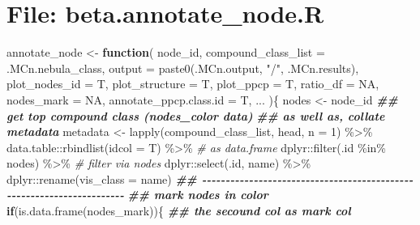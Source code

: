 \documentclass[
]{article}
\newenvironment{Shaded}{\begin{snugshade}}{\end{snugshade}}
\newcommand{\AttributeTok}[1]{\textcolor[rgb]{0.77,0.63,0.00}{#1}}
\newcommand{\CommentTok}[1]{\textcolor[rgb]{0.56,0.35,0.01}{\textit{#1}}}
\newcommand{\ConstantTok}[1]{\textcolor[rgb]{0.00,0.00,0.00}{#1}}
\newcommand{\ControlFlowTok}[1]{\textcolor[rgb]{0.13,0.29,0.53}{\textbf{#1}}}
\newcommand{\DecValTok}[1]{\textcolor[rgb]{0.00,0.00,0.81}{#1}}
\newcommand{\DocumentationTok}[1]{\textcolor[rgb]{0.56,0.35,0.01}{\textbf{\textit{#1}}}}
\newcommand{\FunctionTok}[1]{\textcolor[rgb]{0.00,0.00,0.00}{#1}}
\newcommand{\NormalTok}[1]{#1}
\newcommand{\OtherTok}[1]{\textcolor[rgb]{0.56,0.35,0.01}{#1}}
\newcommand{\SpecialCharTok}[1]{\textcolor[rgb]{0.00,0.00,0.00}{#1}}
\newcommand{\StringTok}[1]{\textcolor[rgb]{0.31,0.60,0.02}{#1}}
\begin{document}
\hypertarget{file-beta.annotate_node.r}{%
\section{File: beta.annotate\_node.R}\label{file-beta.annotate_node.r}}

\begin{Shaded}
\begin{Highlighting}[]
\NormalTok{annotate\_node }\OtherTok{\textless{}{-}} 
  \ControlFlowTok{function}\NormalTok{(}
\NormalTok{           node\_id,}
           \AttributeTok{compound\_class\_list =}\NormalTok{ .MCn.nebula\_class,}
           \AttributeTok{output =} \FunctionTok{paste0}\NormalTok{(.MCn.output, }\StringTok{"/"}\NormalTok{, .MCn.results),}
           \AttributeTok{plot\_nodes\_id =}\NormalTok{ T,}
           \AttributeTok{plot\_structure =}\NormalTok{ T,}
           \AttributeTok{plot\_ppcp =}\NormalTok{ T,}
           \AttributeTok{ratio\_df =} \ConstantTok{NA}\NormalTok{,}
           \AttributeTok{nodes\_mark =} \ConstantTok{NA}\NormalTok{,}
           \AttributeTok{annotate\_ppcp.class.id =}\NormalTok{ T,}
\NormalTok{           ...}
\NormalTok{           )\{}
\NormalTok{    nodes }\OtherTok{\textless{}{-}}\NormalTok{ node\_id}
    \DocumentationTok{\#\# get top compound class (nodes\_color data)}
    \DocumentationTok{\#\# as well as, collate metadata}
\NormalTok{    metadata }\OtherTok{\textless{}{-}} \FunctionTok{lapply}\NormalTok{(compound\_class\_list, head, }\AttributeTok{n =} \DecValTok{1}\NormalTok{) }\SpecialCharTok{\%\textgreater{}\%}
\NormalTok{      data.table}\SpecialCharTok{::}\FunctionTok{rbindlist}\NormalTok{(}\AttributeTok{idcol =}\NormalTok{ T) }\SpecialCharTok{\%\textgreater{}\%} \CommentTok{\# as data.frame}
\NormalTok{      dplyr}\SpecialCharTok{::}\FunctionTok{filter}\NormalTok{(.id }\SpecialCharTok{\%in\%}\NormalTok{ nodes) }\SpecialCharTok{\%\textgreater{}\%} \CommentTok{\# filter via nodes}
\NormalTok{      dplyr}\SpecialCharTok{::}\FunctionTok{select}\NormalTok{(.id, name) }\SpecialCharTok{\%\textgreater{}\%}
\NormalTok{      dplyr}\SpecialCharTok{::}\FunctionTok{rename}\NormalTok{(}\AttributeTok{vis\_class =}\NormalTok{ name)}
    \DocumentationTok{\#\# {-}{-}{-}{-}{-}{-}{-}{-}{-}{-}{-}{-}{-}{-}{-}{-}{-}{-}{-}{-}{-}{-}{-}{-}{-}{-}{-}{-}{-}{-}{-}{-}{-}{-}{-}{-}{-}{-}{-}{-}{-}{-}{-}{-}{-}{-}{-}{-}{-}{-}{-}{-}{-}{-}{-}{-}{-}{-}{-}{-}{-}{-}{-}{-}{-}{-}{-}{-}{-}{-} }
    \DocumentationTok{\#\# mark nodes in color}
    \ControlFlowTok{if}\NormalTok{(}\FunctionTok{is.data.frame}\NormalTok{(nodes\_mark))\{}
      \DocumentationTok{\#\# the secound col as mark col}

\end{Highlighting}
\end{Shaded}
\end{document}
